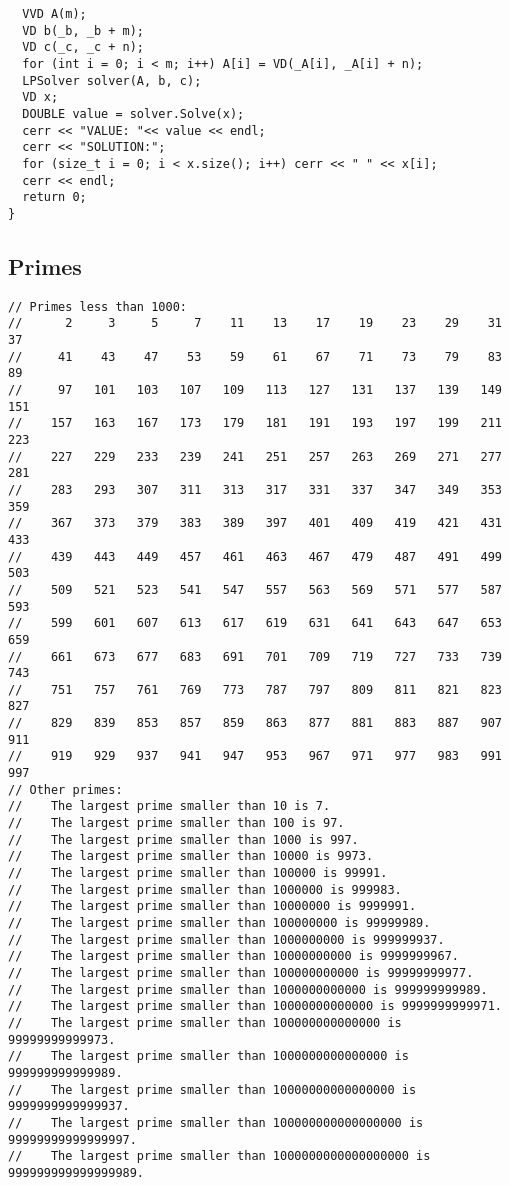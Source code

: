\documentclass[10pt,letterpaper,twocolumn,twosided]{article}
\begin{document}
\begin{lstlisting}
  VVD A(m);
  VD b(_b, _b + m);
  VD c(_c, _c + n);
  for (int i = 0; i < m; i++) A[i] = VD(_A[i], _A[i] + n);
  LPSolver solver(A, b, c);
  VD x;
  DOUBLE value = solver.Solve(x);
  cerr << "VALUE: "<< value << endl;
  cerr << "SOLUTION:";
  for (size_t i = 0; i < x.size(); i++) cerr << " " << x[i];
  cerr << endl;
  return 0;
}
\end{lstlisting}


\subsection{Primes}

\begin{lstlisting}
// Primes less than 1000:
//      2     3     5     7    11    13    17    19    23    29    31    37
//     41    43    47    53    59    61    67    71    73    79    83    89
//     97   101   103   107   109   113   127   131   137   139   149   151
//    157   163   167   173   179   181   191   193   197   199   211   223
//    227   229   233   239   241   251   257   263   269   271   277   281
//    283   293   307   311   313   317   331   337   347   349   353   359
//    367   373   379   383   389   397   401   409   419   421   431   433
//    439   443   449   457   461   463   467   479   487   491   499   503
//    509   521   523   541   547   557   563   569   571   577   587   593
//    599   601   607   613   617   619   631   641   643   647   653   659
//    661   673   677   683   691   701   709   719   727   733   739   743
//    751   757   761   769   773   787   797   809   811   821   823   827
//    829   839   853   857   859   863   877   881   883   887   907   911
//    919   929   937   941   947   953   967   971   977   983   991   997
// Other primes:
//    The largest prime smaller than 10 is 7.
//    The largest prime smaller than 100 is 97.
//    The largest prime smaller than 1000 is 997.
//    The largest prime smaller than 10000 is 9973.
//    The largest prime smaller than 100000 is 99991.
//    The largest prime smaller than 1000000 is 999983.
//    The largest prime smaller than 10000000 is 9999991.
//    The largest prime smaller than 100000000 is 99999989.
//    The largest prime smaller than 1000000000 is 999999937.
//    The largest prime smaller than 10000000000 is 9999999967.
//    The largest prime smaller than 100000000000 is 99999999977.
//    The largest prime smaller than 1000000000000 is 999999999989.
//    The largest prime smaller than 10000000000000 is 9999999999971.
//    The largest prime smaller than 100000000000000 is 99999999999973.
//    The largest prime smaller than 1000000000000000 is 999999999999989.
//    The largest prime smaller than 10000000000000000 is 9999999999999937.
//    The largest prime smaller than 100000000000000000 is 99999999999999997.
//    The largest prime smaller than 1000000000000000000 is 999999999999999989.
\end{lstlisting}
\end{document}
